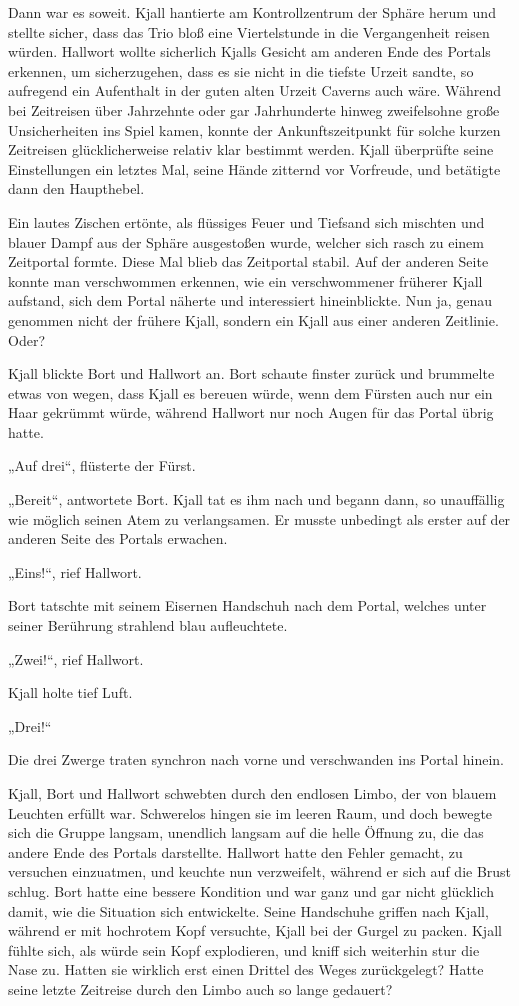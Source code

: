 Dann war es soweit. Kjall hantierte am Kontrollzentrum der Sphäre herum und stellte sicher, dass das Trio bloß eine Viertelstunde in die Vergangenheit reisen würden. Hallwort wollte sicherlich Kjalls Gesicht am anderen Ende des Portals erkennen, um sicherzugehen, dass es sie nicht in die tiefste Urzeit sandte, so aufregend ein Aufenthalt in der guten alten Urzeit Caverns auch wäre. Während bei Zeitreisen über Jahrzehnte oder gar Jahrhunderte hinweg zweifelsohne große Unsicherheiten ins Spiel kamen, konnte der Ankunftszeitpunkt für solche kurzen Zeitreisen glücklicherweise relativ klar bestimmt werden. Kjall überprüfte seine Einstellungen ein letztes Mal, seine Hände zitternd vor Vorfreude, und betätigte dann den Haupthebel.

Ein lautes Zischen ertönte, als flüssiges Feuer und Tiefsand sich mischten und blauer Dampf aus der Sphäre ausgestoßen wurde, welcher sich rasch zu einem Zeitportal formte. Diese Mal blieb das Zeitportal stabil. Auf der anderen Seite konnte man verschwommen erkennen, wie ein verschwommener früherer Kjall aufstand, sich dem Portal näherte und interessiert hineinblickte. Nun ja, genau genommen nicht der frühere Kjall, sondern ein Kjall aus einer anderen Zeitlinie. Oder?

Kjall blickte Bort und Hallwort an. Bort schaute finster zurück und brummelte etwas von wegen, dass Kjall es bereuen würde, wenn dem Fürsten auch nur ein Haar gekrümmt würde, während Hallwort nur noch Augen für das Portal übrig hatte.

„Auf drei“, flüsterte der Fürst.

„Bereit“, antwortete Bort. Kjall tat es ihm nach und begann dann, so unauffällig wie möglich seinen Atem zu verlangsamen. Er musste unbedingt als erster auf der anderen Seite des Portals erwachen.

„Eins!“, rief Hallwort.

Bort tatschte mit seinem Eisernen Handschuh nach dem Portal, welches unter seiner Berührung strahlend blau aufleuchtete.

„Zwei!“, rief Hallwort.

Kjall holte tief Luft.

„Drei!“

Die drei Zwerge traten synchron nach vorne und verschwanden ins Portal hinein.\bigskip



Kjall, Bort und Hallwort schwebten durch den endlosen Limbo, der von blauem Leuchten erfüllt war. Schwerelos hingen sie im leeren Raum, und doch bewegte sich die Gruppe langsam, unendlich langsam auf die helle Öffnung zu, die das andere Ende des Portals darstellte. Hallwort hatte den Fehler gemacht, zu versuchen einzuatmen, und keuchte nun verzweifelt, während er sich auf die Brust schlug. Bort hatte eine bessere Kondition und war ganz und gar nicht glücklich damit, wie die Situation sich entwickelte. Seine Handschuhe griffen nach Kjall, während er mit hochrotem Kopf versuchte, Kjall bei der Gurgel zu packen. Kjall fühlte sich, als würde sein Kopf explodieren, und kniff sich weiterhin stur die Nase zu. Hatten sie wirklich erst einen Drittel des Weges zurückgelegt? Hatte seine letzte Zeitreise durch den Limbo auch so lange gedauert?

